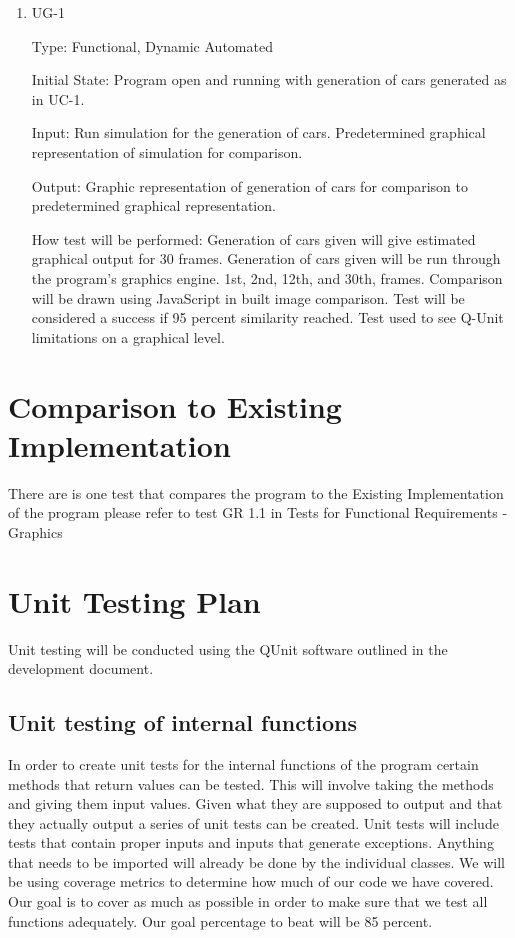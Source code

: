 \documentclass[12pt, titlepage]{article}
\begin{document}
\begin{enumerate}

\item{UG-1\\}

Type: Functional, Dynamic Automated
					
Initial State: Program open and running with generation of cars generated as in 
UC-1.
					
Input: Run simulation for the generation of cars. Predetermined graphical 
representation of simulation for comparison.
					
Output: Graphic representation of generation of cars for comparison to 
predetermined graphical representation.
					
How test will be performed: Generation of cars given will give estimated 
graphical output for 30 frames. Generation of cars given will be run through the 
program's graphics engine. 1st, 2nd, 12th, and 30th, frames. Comparison will be 
drawn using JavaScript in built image comparison. Test will be considered a 
success if 95 percent similarity reached. Test used to see Q-Unit limitations on 
a graphical level.

\end{enumerate}
	
\section{Comparison to Existing Implementation}	

There are is one test that compares the program to the Existing Implementation 
of the program please refer to test GR 1.1 in Tests for Functional Requirements 
- Graphics
				
\section{Unit Testing Plan}

Unit testing will be conducted using the QUnit software outlined in the 
development document.
		
\subsection{Unit testing of internal functions}

In order to create unit tests for the internal functions of the program certain 
methods that return values
can be tested. This will involve taking the methods and giving them input 
values. Given what they are
supposed to output and that they actually output a series of unit tests can be 
created. Unit tests will include
tests that contain proper inputs and inputs that generate exceptions.  Anything 
that needs to be imported will already be done
by the individual classes. We will be using coverage metrics to determine how 
much of our code we have
covered. Our goal is to cover as much as possible in order to make sure that we 
test all functions adequately.
Our goal percentage to beat will be 85 percent.
		
\end{document}

